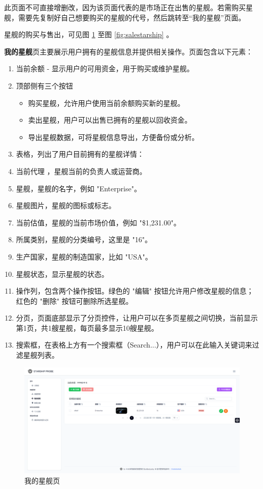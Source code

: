 \documentclass{base}
\begin{document}
此页面不可直接增删改，因为该页面代表的是市场正在出售的星舰。若需购买星舰，需要先复制好自己想要购买的星舰的代号，然后跳转至“我的星舰”页面。

星舰的购买与售出，可见图 \ref{fig:mystatshippage} 至图 \ref{fig:salestarship} 。

\textbf{我的星舰}页主要展示用户拥有的星舰信息并提供相关操作。页面包含以下元素：
\begin{enumerate}
	\item 当前余额 - 显示用户的可用资金，用于购买或维护星舰。
	\item 顶部侧有三个按钮
	\begin{itemize}
		\item 购买星舰，允许用户使用当前余额购买新的星舰。
		\item 卖出星舰，用户可以出售已拥有的星舰以回收资金。
		\item 导出星舰数据，可将星舰信息导出，方便备份或分析。
	\end{itemize}
	
	\item 表格，列出了用户目前拥有的星舰详情：
	\item 当前代理 ，星舰当前的负责人或运营商。
	\item 星舰，星舰的名字，例如 "Enterprise"。
	\item 星舰图片，星舰的图标或标志。
	\item 当前估值，星舰的当前市场价值，例如 "\$1,231.00"。
	\item 所属类别，星舰的分类编号，这里是 "16"。
	\item 生产国家，星舰的制造国家，比如 "USA"。
	\item 星舰状态，显示星舰的状态。
	\item 操作列，包含两个操作按钮。绿色的 "编辑" 按钮允许用户修改星舰的信息；红色的 "删除" 按钮可删除所选星舰。
	\item 分页，页面底部显示了分页控件，让用户可以在多页星舰之间切换，当前显示第1页，共1艘星舰，每页最多显示10艘星舰。
	\item 搜索框，在表格上方有一个搜索框（Search...），用户可以在此输入关键词来过滤星舰列表。

\end{enumerate}



\begin{figure}[H]
	\centering
	\includegraphics[width=\linewidth]{images/MyStatshipPage}
	\caption{我的星舰页}
	\label{fig:mystatshippage}
\end{figure}
\end{document}
